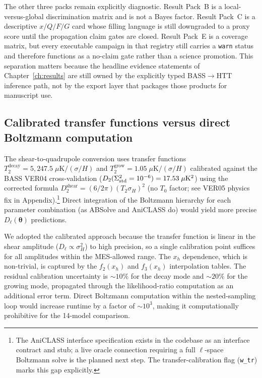 The other three packs remain explicitly diagnostic.
Result Pack~B is a local-versus-global discrimination matrix and is not
a Bayes factor.
Result Pack~C is a descriptive $x/Q/F/G$ card whose filling language is
still downgraded to a proxy score until the propagation claim gates are
closed.
Result Pack~E is a coverage matrix, but every executable
campaign in that registry still carries a \texttt{warn} status and
therefore functions as a no-claim gate rather than a science
promotion.
This separation matters because the headline evidence statements of
Chapter~\ref{ch:results} are still owned by the explicitly typed
BASS$\rightarrow$HTT inference path, not by the export layer that
packages those products for manuscript use.


\subsection{Calibrated transfer functions versus direct
  Boltzmann computation}

The shear-to-quadrupole conversion uses transfer functions
$T_2^{\mathrm{decay}} = 5{,}247.5\;\mu\mathrm{K}/(\sigma/H)$ and
$T_2^{\mathrm{grow}} = 1.05\;\mu\mathrm{K}/(\sigma/H)$ calibrated
against the BASS VER04 cross-validation
($D_2(\Sigma^2_{\mathrm{std}}=10^{-6}) = 17.53\;\mu\mathrm{K}^2$)
using the corrected formula $D_2^{\mathrm{shear}} = (6/2\pi)(T_2 \sigma_H)^2$
(no $T_0$ factor; see VER05 physics fix in Appendix).\footnote{%
  The AniCLASS interface specification exists in the codebase
  as an interface contract and stub; a live oracle connection
  requiring a full $\ell$-space Boltzmann solve is the
  planned next step.  The transfer-calibration flag
  (\texttt{w\_tr}) marks this gap explicitly.}
Direct integration of the Boltzmann hierarchy for each parameter
combination (as ABSolve and AniCLASS do) would yield more precise
$D_\ell(\boldsymbol{\theta})$ predictions.

We adopted the calibrated approach because the transfer function
is linear in the shear amplitude ($D_\ell \propto \sigma_H^2$)
to high precision, so a single calibration point suffices for
all amplitudes within the MES-allowed range.  The $x_h$
dependence, which is non-trivial, is captured by the
$f_2(x_h)$ and $f_3(x_h)$ interpolation tables.  The residual
calibration uncertainty is $\sim 10\%$ for the decay mode and
$\sim 20\%$ for the growing mode, propagated through the
likelihood-ratio computation as an additional error term.  Direct
Boltzmann computation within the nested-sampling loop would
increase runtime by a factor of $\sim 10^3$, making it
computationally prohibitive for the 14-model comparison.


